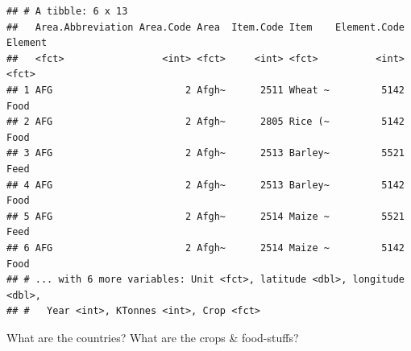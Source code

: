\documentclass[]{article}
\begin{document}
\begin{verbatim}
## # A tibble: 6 x 13
##   Area.Abbreviation Area.Code Area  Item.Code Item    Element.Code Element
##   <fct>                 <int> <fct>     <int> <fct>          <int> <fct>  
## 1 AFG                       2 Afgh~      2511 Wheat ~         5142 Food   
## 2 AFG                       2 Afgh~      2805 Rice (~         5142 Food   
## 3 AFG                       2 Afgh~      2513 Barley~         5521 Feed   
## 4 AFG                       2 Afgh~      2513 Barley~         5142 Food   
## 5 AFG                       2 Afgh~      2514 Maize ~         5521 Feed   
## 6 AFG                       2 Afgh~      2514 Maize ~         5142 Food   
## # ... with 6 more variables: Unit <fct>, latitude <dbl>, longitude <dbl>,
## #   Year <int>, KTonnes <int>, Crop <fct>
\end{verbatim}

What are the countries? What are the crops \& food-stuffs?
\end{document}
